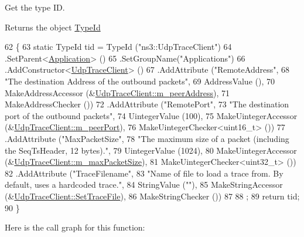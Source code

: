 Get the type ID. 

\begin{DoxyReturn}{Returns}
the object \hyperlink{classns3_1_1TypeId}{Type\+Id} 
\end{DoxyReturn}

\begin{DoxyCode}
62 \{
63   \textcolor{keyword}{static} TypeId tid = TypeId (\textcolor{stringliteral}{"ns3::UdpTraceClient"})
64     .SetParent<\hyperlink{classns3_1_1Application_acd261926c72b02cdb48fc7f8838ee173}{Application}> ()
65     .SetGroupName(\textcolor{stringliteral}{"Applications"})
66     .AddConstructor<\hyperlink{structns3_1_1UdpTraceClient_a5d09887e8f1b9de87667547e7317b0f3}{UdpTraceClient}> ()
67     .AddAttribute (\textcolor{stringliteral}{"RemoteAddress"},
68                    \textcolor{stringliteral}{"The destination Address of the outbound packets"},
69                    AddressValue (),
70                    MakeAddressAccessor (&\hyperlink{structns3_1_1UdpTraceClient_a23963b5603afc628e516eb1eccb14ad8}{UdpTraceClient::m\_peerAddress}),
71                    MakeAddressChecker ())
72     .AddAttribute (\textcolor{stringliteral}{"RemotePort"},
73                    \textcolor{stringliteral}{"The destination port of the outbound packets"},
74                    UintegerValue (100),
75                    MakeUintegerAccessor (&\hyperlink{structns3_1_1UdpTraceClient_a218996a58ca6cb1a17edd8df252596f5}{UdpTraceClient::m\_peerPort}),
76                    MakeUintegerChecker<uint16\_t> ())
77     .AddAttribute (\textcolor{stringliteral}{"MaxPacketSize"},
78                    \textcolor{stringliteral}{"The maximum size of a packet (including the SeqTsHeader, 12 bytes)."},
79                    UintegerValue (1024),
80                    MakeUintegerAccessor (&\hyperlink{structns3_1_1UdpTraceClient_aa5ba9f3cd73ca417df59d14bb18e16a1}{UdpTraceClient::m\_maxPacketSize}),
81                    MakeUintegerChecker<uint32\_t> ())
82     .AddAttribute (\textcolor{stringliteral}{"TraceFilename"},
83                    \textcolor{stringliteral}{"Name of file to load a trace from. By default, uses a hardcoded trace."},
84                    StringValue (\textcolor{stringliteral}{""}),
85                    MakeStringAccessor (&\hyperlink{structns3_1_1UdpTraceClient_a3439722a8941b9c1ab3fd564dcdafeb0}{UdpTraceClient::SetTraceFile}),
86                    MakeStringChecker ())
87 
88   ;
89   \textcolor{keywordflow}{return} tid;
90 \}
\end{DoxyCode}


Here is the call graph for this function\+:




